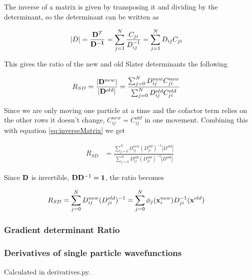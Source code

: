 \documentclass[x11names]{article}
\begin{document}
			The inverse of a matrix is given by transposing it and dividing by the determinant, so the determinant can be written as

			\begin{align}
				|D| &= \frac{\vb{D}^T}{\vb{D^{-1}}} = \sum_{j=1}^{N}{\frac{C_{ji}  }{ D^{-1}_{ij} } } = \sum_{j=1}^{N}{ D_{ij}C_{ji} }
				\label{eq:inverseMatrix}
			\end{align}

			This gives the ratio of the new and old Slater determinants the following

			\begin{align}
				R_{SD} &= \frac{|\vb{D}^{new}|}{|\vb{D}^{old}|} = \frac{\sum_{j=0}^N D_{ij}^{new} C_{ji}^{new} }{\sum_{j=0}^N D_{ij}^{old} C_{ji}^{old} }
			\end{align}

			Since we are only moving one particle at a time and the cofactor term relies on the other rows it doesn't change, \(C^{new}_{ij} = C^{old}_{ij}\) in one movement. Combining this with equation \eqref{eq:inverseMatrix} we get

			\begin{align}
				R_{SD} &=  \frac{\sum_{j=0}^N D_{ij}^{new} (D_{ji}^{old})^{-1} |D^{old}| }{\sum_{j=0}^N D_{ij}^{old} (D_{ji}^{old})^{-1} |D^{old}| }
			\end{align}

			Since \(\vb{D}\) is invertible, \(\vb{D}\vb{D}^{-1} = \vb{1}\), the ratio becomes

			\begin{align}
				R_{SD} &= \sum_{j = 0}^{N}D_{ij}^{new}(D_{ji}^{old})^{-1} = \sum_{j = 0}^{N} \phi_j(\vb{x}^{new}_i) D_{ji}^{-1}(\vb{x}^{old})
			\end{align}

		\subsubsection{Gradient determinant Ratio}

		\subsubsection{Derivatives of single particle wavefunctions}
			Calculated in  derivatives.py.
\end{document}
